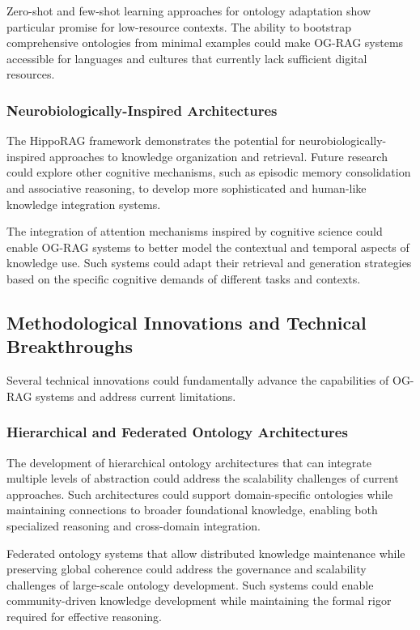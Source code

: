Zero-shot and few-shot learning approaches for ontology adaptation show particular promise for low-resource contexts. The ability to bootstrap comprehensive ontologies from minimal examples could make OG-RAG systems accessible for languages and cultures that currently lack sufficient digital resources.

\subsubsection{Neurobiologically-Inspired Architectures}

The HippoRAG framework \cite{bai2024hipporag} demonstrates the potential for neurobiologically-inspired approaches to knowledge organization and retrieval. Future research could explore other cognitive mechanisms, such as episodic memory consolidation and associative reasoning, to develop more sophisticated and human-like knowledge integration systems.

The integration of attention mechanisms inspired by cognitive science could enable OG-RAG systems to better model the contextual and temporal aspects of knowledge use. Such systems could adapt their retrieval and generation strategies based on the specific cognitive demands of different tasks and contexts.

\subsection{Methodological Innovations and Technical Breakthroughs}

Several technical innovations could fundamentally advance the capabilities of OG-RAG systems and address current limitations.

\subsubsection{Hierarchical and Federated Ontology Architectures}

The development of hierarchical ontology architectures that can integrate multiple levels of abstraction could address the scalability challenges of current approaches. Such architectures could support domain-specific ontologies while maintaining connections to broader foundational knowledge, enabling both specialized reasoning and cross-domain integration.

Federated ontology systems that allow distributed knowledge maintenance while preserving global coherence could address the governance and scalability challenges of large-scale ontology development. Such systems could enable community-driven knowledge development while maintaining the formal rigor required for effective reasoning.

